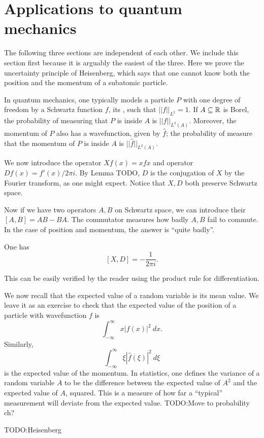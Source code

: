 \section{Applications to quantum mechanics}
The following three sections are independent of each other. We include this section first because it is arguably the easiest of the three.
Here we prove the uncertainty principle of Heisenberg, which says that one cannot know both the position and the momentum of a subatomic particle.

In quantum mechanics, one typically models a particle $P$ with one degree of freedom by a Schwartz function $f$, its , such that $||f||_{L^{2}} = 1$.
If $A \subseteq \mathbb{R}$ is Borel, the probability of measuring that $P$ is inside $A$ is $||f||_{L^{2}(A)}$.
Moreover, the momentum of $P$ also has a wavefunction, given by $\hat{f}$; the probability of measure that the momentum of $P$ is inside $A$ is $||\hat{f}||_{L^{2}(A)}$.

We now introduce the  operator $Xf(x) = xfx$ and  operator $Df(x) = f'(x)/2\pi i$. By Lemma TODO, $D$ is the conjugation of $X$ by the Fourier transform, as one might expect. Notice that $X,D$ both preserve Schwartz space.

Now if we have two operators $A,B$ on Schwartz space, we can introduce their  $[A,B] = AB - BA$. The commutator measures how badly $A,B$ fail to commute.
In the case of position and momentum, the answer is ``quite badly''.

\begin{theorem}
One has
\[[X, D] = -\frac{1}{2\pi i}.\]
\end{theorem}
This can be easily verified by the reader using the product rule for differentiation.

We now recall that the expected value of a random variable is its mean value. We leave it as an exercise to check that the expected value of the position of a particle with wavefunction $f$ is
\[\int_{-\infty}^{\infty} x|f(x)|^{2}~dx.\]
Similarly,
\[\int_{-\infty}^{\infty} \xi|\hat{f}(\xi)|^{2}~d\xi\]
is the expected value of the momentum.
In statistics, one defines the variance of a random variable $A$ to be the difference between the expected value of $A^{2}$ and the expected value of $A$, squared.
This is a measure of how far a ``typical'' measurement will deviate from the expected value.
TODO:\@ Move to probability ch?

TODO:\@ Heisenberg

